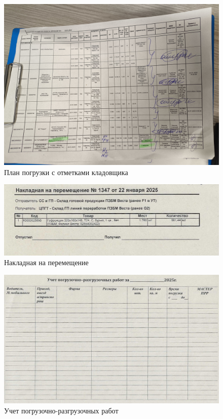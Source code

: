 \begin{figure}
\begin{center}
 \includegraphics[height=0.4\textheight, keepaspectratio]{Pics/IX план погрузки.jpg }
\end{center}
 \caption{План погрузки с отметками кладовщика}
 \label{pic:IX план погрузки}
\end{figure}

\begin{figure}
\begin{center}
 \includegraphics[height=0.22\textheight, keepaspectratio]{Pics/IX.13.jpg }
\end{center}
 \caption{Накладная на перемещение}
 \label{pic:IX.13}
\end{figure}

\begin{figure}
\begin{center}
 \includegraphics[height=0.4\textheight, keepaspectratio]{Pics/IX.8.jpg }
\end{center}
 \caption{Учет погрузочно-разгрузочных работ}
 \label{pic:IX.8}
\end{figure}


